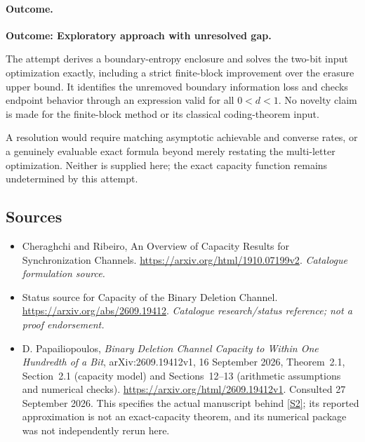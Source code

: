 \documentclass[11pt,a4paper]{article}
\newcommand{\sref}[2]{\hyperlink{source:#1:#2}{[S#2]}}
\numberwithin{equation}{section}
\begin{document}
\paragraph{Outcome.}
\textbf{Outcome: Exploratory approach with unresolved gap.}

The attempt derives a boundary-entropy enclosure and solves the two-bit
input optimization exactly, including a strict finite-block improvement
over the erasure upper bound. It identifies the unremoved boundary
information loss and checks endpoint behavior through an expression
valid for all $0<d<1$. No novelty claim is made for the finite-block
method or its classical coding-theorem input.

A resolution would require matching asymptotic achievable and converse
rates, or a genuinely evaluable exact formula beyond merely restating
the multi-letter optimization. Neither is supplied here; the exact
capacity function remains undetermined by this attempt.
\subsection{Sources}
\begin{itemize}\raggedright
\item[\textnormal{[S1]}]\hypertarget{source:225:1}{} Cheraghchi and Ribeiro, An Overview of Capacity Results for Synchronization Channels.
\url{https://arxiv.org/html/1910.07199v2}.
{\small\textit{Catalogue formulation source.}}
\item[\textnormal{[S2]}]\hypertarget{source:225:2}{} Status source for Capacity of the Binary Deletion Channel.
\url{https://arxiv.org/abs/2609.19412}.
{\small\textit{Catalogue research/status reference; not a proof endorsement.}}
\item[\textnormal{[E1]}]\hypertarget{extra:225:1}{}
D. Papailiopoulos, \emph{Binary Deletion Channel Capacity to Within One
Hundredth of a Bit}, arXiv:2609.19412v1, 16 September 2026,
Theorem~2.1, Section~2.1 (capacity model) and Sections~12--13
(arithmetic assumptions and numerical checks).
\url{https://arxiv.org/html/2609.19412v1}.
Consulted 27 September 2026. This specifies the actual manuscript behind
\sref{225}{2}; its reported approximation is not an exact-capacity theorem,
and its numerical package was not independently rerun here.
\end{itemize}
\end{document}
